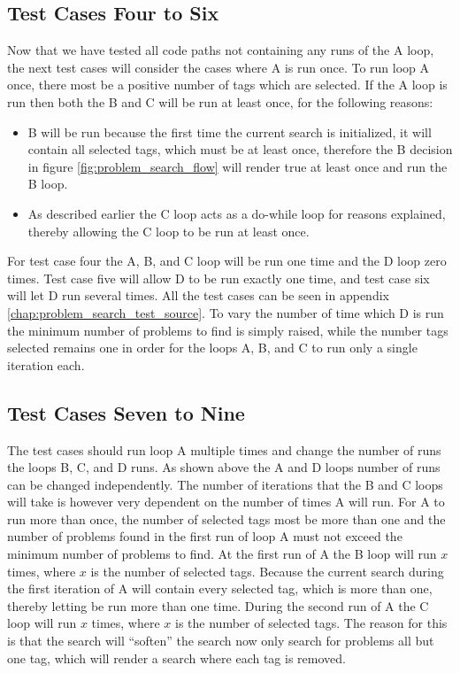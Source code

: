 \subsection{Test Cases Four to Six}
Now that we have tested all code paths not containing any runs of the A loop, the next test cases will consider the cases where A is run once.
To run loop A once, there most be a positive number of tags which are selected.
If the A loop is run then both the B and C will be run at least once, for the following reasons:
\begin{itemize}
	\item B will be run because the first time the current search is initialized, it will contain all selected tags, which must be at least once, therefore the B decision in figure \ref{fig:problem_search_flow} will render true at least once and run the B loop.
	\item As described earlier the C loop acts as a do-while loop for reasons explained, thereby allowing the C loop to be run at least once.
\end{itemize}

For test case four the A, B, and C loop will be run one time and the D loop zero times.
Test case five will allow D to be run exactly one time, and test case six will let D run several times.
All the test cases can be seen in appendix \ref{chap:problem_search_test_source}.
To vary the number of time which D is run the minimum number of problems to find is simply raised, while the number tags selected remains one in order for the loops A, B, and C to run only a single iteration each.

\subsection{Test Cases Seven to Nine}
The test cases should run loop A multiple times and change the number of runs the loops B, C, and D runs.
As shown above the A and D loops number of runs can be changed independently.
The number of iterations that the B and C loops will take is however very dependent on the number of times A will run.
For A to run more than once, the number of selected tags most be more than one and the number of problems found in the first run of loop A must not exceed the minimum number of problems to find.
At the first run of A the B loop will run $x$ times, where $x$ is the number of selected tags.
Because the current search during the first iteration of A will contain every selected tag, which is more than one, thereby letting be run more than one time.
During the second run of A the C loop will run $x$ times, where $x$ is the number of selected tags.
The reason for this is that the search will ``soften'' the search now only search for problems all but one tag, which will render a search where each tag is removed.

